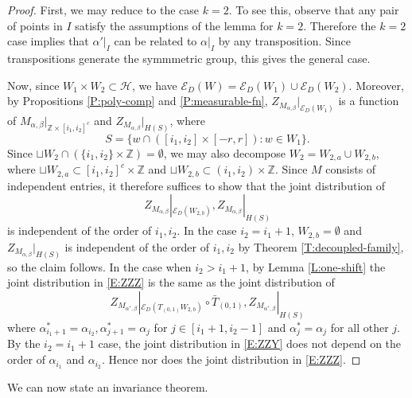 \documentclass[aop, preprint]{imsart}
\theoremstyle{plain}
\theoremstyle{definition}
\theoremstyle{plain}
\newcommand{\sset}{\subset}
\newcommand{\al}{\alpha}
\newcommand{\be}{\beta}
\newcommand{\scrE}{\mathcal{E}}
\newcommand{\scrH}{\mathcal{H}}
\newcommand{\Z}{\mathds{Z}}
\newcommand{\X}{\times}
\begin{document}
\begin{proof}
	First, we may reduce to the case $k = 2$. To see this, observe that any pair of points in $I$ satisfy the assumptions of the lemma for $k = 2$. Therefore the $k=2$ case implies that $\al'|_I$ can be related to $\al|_I$ by any transposition. Since transpositions generate the symmmetric group, this gives the general case.
	
	Now, since $W_1 \X W_2 \sset \scrH$, we have $\scrE_D(W) = \scrE_D(W_1) \cup \scrE_D(W_2)$. Moreover, by Propositions \ref{P:poly-comp} and \ref{P:measurable-fn}, $Z_{M_{\al, \be}}|_{\scrE_D(W_1)}$ is a function of $M_{\al, \be}|_{\Z \X [i_1, i_2]^c}$ and $Z_{M_{\al, \be}}|_{H(S)}$, where 
	$$
	S = \{w \cap ([i_1, i_2] \X [-r, r]) : w \in W_1\}.
	$$
	Since $\sqcup W_2 \cap (\{i_1, i_2\} \X\Z) = \emptyset$, we may also decompose $W_2 = W_{2, a} \cup W_{2, b}$, where $\sqcup W_{2, a} \sset [i_1, i_2]^c \X\Z$ and $\sqcup W_{2, b} \sset (i_1, i_2) \X \Z$. Since $M$ consists of independent entries, it therefore suffices to show that the joint distribution of
	\begin{equation}
	\label{E:ZZZ}
	Z_{M_{\al, \be}}|_{\scrE_D(W_{2, b})}, Z_{M_{\al, \be}}|_{H(S)}
	\end{equation}
	is independent of the order of $i_1, i_2$. In the case $i_2 = i_1 + 1$, $W_{2, b} = \emptyset$ and $Z_{M_{\al, \be}}|_{H(S)}$ is independent of the order of $i_1, i_2$ by Theorem \ref{T:decoupled-family}, so the claim follows. In the case when $i_2 > i_1 + 1$, by Lemma \ref{L:one-shift} the joint distribution in \eqref{E:ZZZ} is the same as the joint distribution of 
	\begin{equation}
	\label{E:ZZY}
	Z_{M_{\al^*, \be}}|_{\scrE_D(T_{(0, 1)} W_{2, b})} \circ \bar T_{(0, 1)}, Z_{M_{\al^*, \be}}|_{H(S)}
	\end{equation}
	where $\al^*_{i_1 + 1} = \al_{i_2}, \al^*_{j+1} = \al_j$ for $j \in [i_1 + 1, i_2-1]$ and $\al^*_j = \al_j$ for all other $j$. By the $i_2 = i_1 + 1$ case, the joint distribution in \eqref{E:ZZY} does not depend on the order of $\al_{i_1}$ and $\al_{i_2}$. Hence nor does the joint distribution in \eqref{E:ZZZ}.
\end{proof}

We can now state an invariance theorem.
\end{document}
